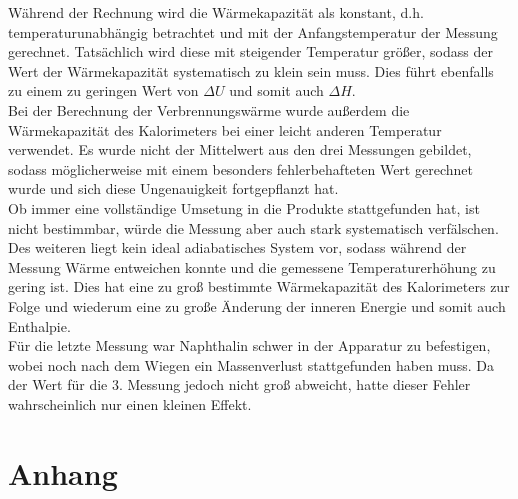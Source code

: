 \documentclass[12pt,a4paper,titlepage,headinclude,bibtotoc]{scrartcl}
\begin{document}
Während der Rechnung wird die Wärmekapazität als konstant, d.h. temperaturunabhängig betrachtet und mit der Anfangstemperatur der Messung gerechnet. Tatsächlich wird diese mit steigender Temperatur größer, sodass der Wert der Wärmekapazität systematisch zu klein sein muss. Dies führt ebenfalls zu einem zu geringen Wert von $\Delta U$ und somit auch $\Delta H$.\\

Bei der Berechnung der Verbrennungswärme wurde außerdem die Wärmekapazität des Kalorimeters bei einer leicht anderen Temperatur verwendet. Es wurde nicht der Mittelwert aus den drei Messungen gebildet, sodass möglicherweise mit einem besonders fehlerbehafteten Wert gerechnet wurde und sich diese Ungenauigkeit fortgepflanzt hat.\\

Ob immer eine vollständige Umsetung in die Produkte stattgefunden hat, ist nicht bestimmbar, würde die Messung aber auch stark systematisch verfälschen.\\
Des weiteren liegt kein ideal adiabatisches System vor, sodass während der Messung Wärme entweichen konnte und die gemessene Temperaturerhöhung zu gering ist. Dies hat eine zu groß bestimmte Wärmekapazität des Kalorimeters zur Folge und wiederum eine zu große Änderung der inneren Energie und somit auch Enthalpie.\\

Für die letzte Messung war Naphthalin schwer in der Apparatur zu befestigen, wobei noch nach dem Wiegen ein Massenverlust stattgefunden haben muss. Da der Wert für die 3. Messung jedoch nicht groß abweicht, hatte dieser Fehler wahrscheinlich nur einen kleinen Effekt.\\
 





\newpage
\section{Anhang}
\end{document}
